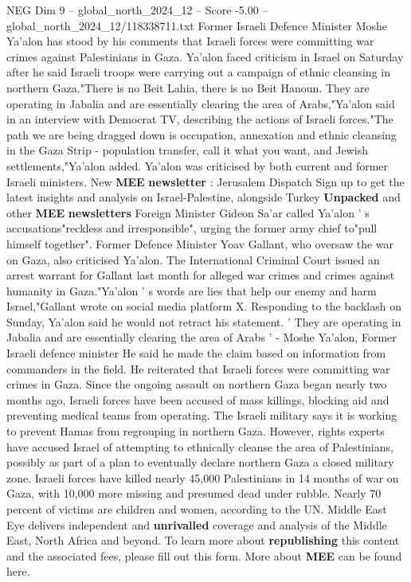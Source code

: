 \begin{textsample}{NEG Dim 9 – global\_north\_2024\_12 – Score -5.00 – global\_north\_2024\_12/118338711.txt}  \label{ex:f9_neg_125}
Former Israeli Defence Minister Moshe Ya'alon has stood by his comments that Israeli forces were committing war crimes against Palestinians in Gaza.
Ya'alon faced criticism in Israel on Saturday after he said Israeli troops were carrying out a campaign of ethnic cleansing in northern Gaza."There is no Beit Lahia, there is no Beit Hanoun.
They are operating in Jabalia and are essentially clearing the area of Arabs,"Ya'alon said in an interview with Democrat TV, describing the actions of Israeli forces."The path we are being dragged down is occupation, annexation and ethnic cleansing in the Gaza Strip - population transfer, call it what you want, and Jewish settlements,"Ya'alon added.
Ya'alon was criticised by both current and former Israeli ministers.
New \textbf{MEE} \textbf{newsletter} : Jerusalem Dispatch Sign up to get the latest insights and analysis on Israel-Palestine, alongside Turkey \textbf{Unpacked} and other \textbf{MEE} \textbf{newsletters} Foreign Minister Gideon Sa'ar called Ya'alon ' s accusations"reckless and irresponsible", urging the former army chief to"pull himself together".
Former Defence Minister Yoav Gallant, who oversaw the war on Gaza, also criticised Ya'alon.
The International Criminal Court issued an arrest warrant for Gallant last month for alleged war crimes and crimes against humanity in Gaza."Ya'alon ' s words are lies that help our enemy and harm Israel,"Gallant wrote on social media platform X.
Responding to the backlash on Sunday, Ya'alon said he would not retract his statement. ' They are operating in Jabalia and are essentially clearing the area of Arabs ' - Moshe Ya'alon, Former Israeli defence minister He said he made the claim based on information from commanders in the field.
He reiterated that Israeli forces were committing war crimes in Gaza.
Since the ongoing assault on northern Gaza began nearly two months ago, Israeli forces have been accused of mass killings, blocking aid and preventing medical teams from operating.
The Israeli military says it is working to prevent Hamas from regrouping in northern Gaza.
However, rights experts have accused Israel of attempting to ethnically cleanse the area of Palestinians, possibly as part of a plan to eventually declare northern Gaza a closed military zone.
Israeli forces have killed nearly 45,000 Palestinians in 14 months of war on Gaza, with 10,000 more missing and presumed dead under rubble.
Nearly 70 percent of victims are children and women, according to the UN.
Middle East Eye delivers independent and \textbf{unrivalled} coverage and analysis of the Middle East, North Africa and beyond.
To learn more about \textbf{republishing} this content and the associated fees, please fill out this form.
More about \textbf{MEE} can be found here.

\end{textsample}
